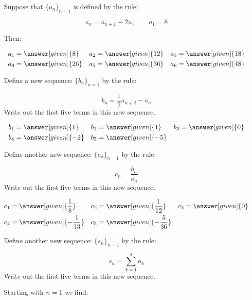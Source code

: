 \documentclass{ximera}
\author{Jim Talamo}
\begin{document}
\begin{exercise}

Suppose that $\{a_n\}_{n=1}$ is defined by the rule:

\[
 a_n = a_{n+1}-2n , \qquad a_1 = 8
\]

Then:

    \begin{align*}
       a_1 &= \answer[given]{8} & 
      a_2 &= \answer[given]{12} & 
      a_3 &= \answer[given]{18} \\
      a_4 &= \answer[given]{26} & 
      a_5 &= \answer[given]{36}  & 
      a_6 &= \answer[given]{48} 
    \end{align*}

\begin{exercise}
Define a new sequence: $\{b_n\}_{n=1}$ by the rule:

\[
b_n = \frac{1}{2}a_{n+2} - a_n
\]
Write out the first five terms in this new sequence.
    
     \begin{align*}
     	b_1 &=  \answer[given]{1}  & 
      	b_2 &=  \answer[given]{1}  & 
	b_3 &= \answer[given]{0}  \\ 
	b_4 &= \answer[given]{-2}  & 
	b_5 &=  \answer[given]{-5}  & 
    \end{align*}
    

    
\end{exercise}

\begin{exercise}
Define another new sequence: $\{c_n\}_{n=1}$ by the rule:

\[
c_n = \frac{b_n}{a_n} 
\]
Write out the first five terms in this new sequence.

     \begin{align*}
     	c_1 &=  \answer[given]{\frac{1}{8}}  & 
      	c_2 &=  \answer[given]{\frac{1}{12}}  & 
	c_3 &= \answer[given]{0}   \\ 
	c_4 &= \answer[given]{-\frac{1}{13}}   & 
	c_5 &= \answer[given]{-\frac{5}{36}}   & 
    \end{align*}
    

\end{exercise}

\begin{exercise}
Define another new sequence: $\{s_n\}_{n=1}$ by the rule:

\[
s_n = \sum_{k=1}^n a_k 
\]
Write out the first five terms in this new sequence.

Starting with $n=1$ we find:


\end{exercise}
\end{exercise}
\end{document}

